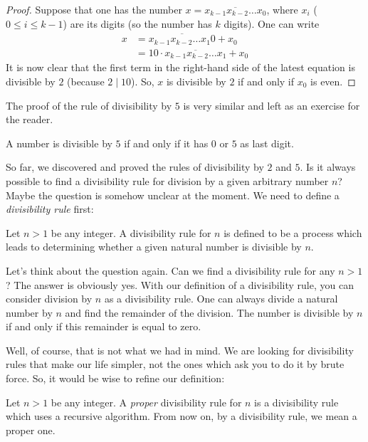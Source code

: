 \documentclass{subfile}
\begin{document}
	\begin{proof}
		Suppose that one has the number $x = \overline{x_{k-1}x_{k-2} \ldots x_0}$, where $x_i$ ($0 \leq i \leq k-1$) are its digits (so the number has $k$ digits). One can write
			\begin{align*}
				x
					&= \overline{x_{k-1} x_{k-2} \ldots x_1 0} + x_0\\
					& = 10 \cdot \overline{x_{k-1} x_{k-2} \ldots x_1} + x_0
			\end{align*}
		It is now clear that the first term in the right-hand side of the latest equation is divisible by $2$ (because $2 \mid 10$). So, $x$ is divisible by $2$ if and only if $x_0$ is even.
	\end{proof}

The proof of the rule of divisibility by $5$ is very similar and left as an exercise for the reader.

	\begin{proposition}[Divisibility by $5$]
		A number is divisible by $5$ if and only if it has $0$ or $5$ as last digit.
	\end{proposition}

So far, we discovered and proved the rules of divisibility by $2$ and $5$. Is it always possible to find a divisibility rule for division by a given arbitrary number $n$? Maybe the question is somehow unclear at the moment. We need to define a \textit{divisibility rule} first:

	\begin{definition}
		Let $n>1$ be any integer. A divisibility rule for $n$ is defined to be a process which leads to determining whether a given natural number is divisible by $n$.
	\end{definition}

Let's think about the question again. Can we find a divisibility rule for any $n>1$? The answer is obviously yes. With our definition of a divisibility rule, you can consider division by $n$ as a divisibility rule. One can always divide a natural number by $n$ and find the remainder of the division. The number is divisible by $n$ if and only if this remainder is equal to zero.

Well, of course, that is not what we had in mind. We are looking for divisibility rules that make our life simpler, not the ones which ask you to do it by brute force. So, it would be wise to refine our definition:

	\begin{definition}
		Let $n>1$ be any integer. A \textit{proper} divisibility rule for $n$ is a divisibility rule which uses a recursive algorithm. From now on, by a divisibility rule, we mean a proper one.
	\end{definition}
\end{document}
